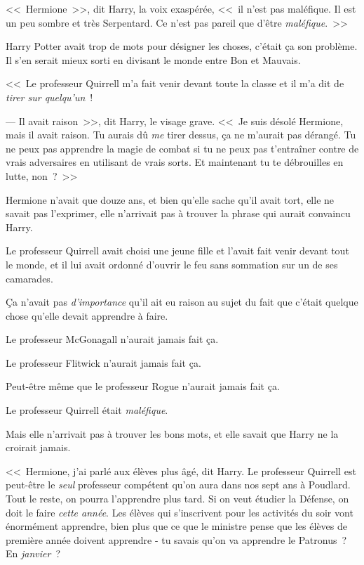 <<~Hermione~>>, dit Harry, la voix exaspérée, <<~il n'est pas maléfique. Il est un peu sombre et très Serpentard. Ce n'est pas pareil que d'être \emph{maléfique}.~>>

Harry Potter avait trop de mots pour désigner les choses, c'était ça son problème. Il s'en serait mieux sorti en divisant le monde entre Bon et Mauvais.

<<~Le professeur Quirrell m'a fait venir devant toute la classe et il m'a dit de \emph{tirer sur quelqu'un}~!

--- Il avait raison~>>, dit Harry, le visage grave. <<~Je suis désolé Hermione, mais il avait raison. Tu aurais dû \emph{me} tirer dessus, ça ne m'aurait pas dérangé. Tu ne peux pas apprendre la magie de combat si tu ne peux pas t'entraîner contre de vrais adversaires en utilisant de vrais sorts. Et maintenant tu te débrouilles en lutte, non~?~>>

Hermione n'avait que douze ans, et bien qu'elle sache qu'il avait tort, elle ne savait pas l'exprimer, elle n'arrivait pas à trouver la phrase qui aurait convaincu Harry.

Le professeur Quirrell avait choisi une jeune fille et l'avait fait venir devant tout le monde, et il lui avait ordonné d'ouvrir le feu sans sommation sur un de ses camarades.

Ça n'avait pas \emph{d'importance} qu'il ait eu raison au sujet du fait que c'était quelque chose qu'elle devait apprendre à faire.

Le professeur McGonagall n'aurait jamais fait ça.

Le professeur Flitwick n'aurait jamais fait ça.

Peut-être même que le professeur Rogue n'aurait jamais fait ça.

Le professeur Quirrell était \emph{maléfique}.

Mais elle n'arrivait pas à trouver les bons mots, et elle savait que Harry ne la croirait jamais.

<<~Hermione, j'ai parlé aux élèves plus âgé, dit Harry. Le professeur Quirrell est peut-être le \emph{seul} professeur compétent qu'on aura dans nos sept ans à Poudlard. Tout le reste, on pourra l'apprendre plus tard. Si on veut étudier la Défense, on doit le faire \emph{cette année}. Les élèves qui s'inscrivent pour les activités du soir vont énormément apprendre, bien plus que ce que le ministre pense que les élèves de première année doivent apprendre - tu savais qu'on va apprendre le Patronus~? En \emph{janvier}~?

